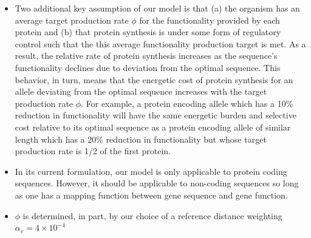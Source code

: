\documentclass{article}
\newcommand{\alphav}{\ensuremath{\alpha_v}\xspace}
\newcommand{\alphavValue}{\ensuremath{4 \times 10^{-4}}\xspace}
\begin{document}
\begin{itemize}
\item Two additional key assumption of our model is that (a) the organism has an average target production rate $\phi$ for the functionality provided by each protein and (b) that protein synthesis is under some form of  regulatory control such that the this average functionality production target is met.
As a result, the relative rate of protein synthesis increases as the sequence's functionality declines due to deviation from the optimal sequence.
This behavior, in turn, means that the energetic cost of protein synthesis for an allele deviating from the optimal sequence increases with the target production rate $\phi$.
For example, a protein encoding allele which has a 10\% reduction in functionality will have the same energetic burden and selective cost relative to its optimal sequence as a protein encoding allele of similar length which has a 20\% reduction in functionality but whose target production rate is 1/2 of the first protein.
\item In its current formulation, our model is only applicable to protein coding sequences.
However, it should be applicable to non-coding sequences so long as one has a mapping function between gene sequence and gene function.
\item $\phi$ is determined, in part, by our choice of a reference distance weighting $\alphav = \alphavValue$
\end{itemize}



\end{document}
